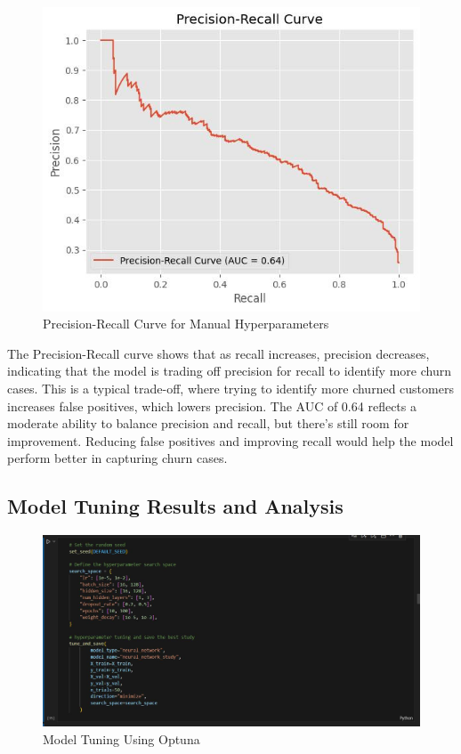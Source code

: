 \begin{figure}[hbt!]
    \centering
    \includegraphics[width=1\linewidth]{Images/5.5.5.a.jpg}
    \caption{Precision-Recall Curve for Manual Hyperparameters}
    \label{fig:enter-label}
\end{figure}

The Precision-Recall curve shows that as recall increases, precision decreases, indicating that the model is trading off precision for recall to identify more churn cases. This is a typical trade-off, where trying to identify more churned customers increases false positives, which lowers precision. The AUC of 0.64 reflects a moderate ability to balance precision and recall, but there’s still room for improvement. Reducing false positives and improving recall would help the model perform better in capturing churn cases.

\subsection{Model Tuning Results and Analysis}

\begin{figure}[hbt!]
    \centering
    \includegraphics[width=1\linewidth]{Images/5.6.a.jpg}
    \caption{Model Tuning Using Optuna }
    \label{fig:enter-label}
\end{figure}


